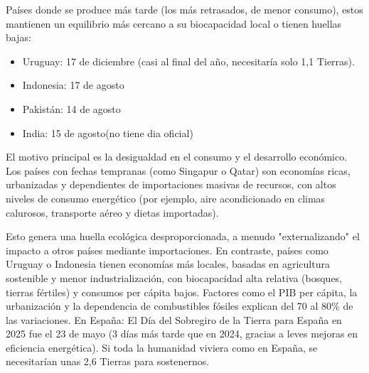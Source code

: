 {\begin{enumerate}[label=\alph*)]
\begin{solution}
Países donde se produce más tarde (los más retrasados, de menor consumo), estos mantienen un equilibrio más cercano
a su biocapacidad local o tienen huellas bajas:
\begin{itemize}
	\item{Uruguay: 17 de diciembre (casi al final del año, necesitaría solo 1,1 Tierras).}
	\item{Indonesia: 17 de agosto}
	\item{Pakistán: 14 de agosto}
	\item{India: 15 de agosto(no tiene dia oficial)}
\end{itemize}

	
\end{solution}

\newpage
\begin{solution}
El motivo principal es la desigualdad en el consumo y el desarrollo económico. Los países con fechas tempranas (como Singapur o Qatar)
son economías ricas, urbanizadas y dependientes de importaciones masivas de recursos, con altos niveles de consumo energético 
(por ejemplo, aire acondicionado en climas calurosos, transporte aéreo y dietas importadas). 
\vspace{1em}

Esto genera una huella ecológica 
desproporcionada, a menudo "externalizando" el impacto a otros países mediante importaciones. En contraste, países como Uruguay 
o Indonesia tienen economías más locales, basadas en agricultura sostenible y menor industrialización, con biocapacidad alta relativa 
(bosques, tierras fértiles) y consumos per cápita bajos. Factores como el PIB per cápita, la urbanización y la dependencia de combustibles fósiles 
explican del 70 al 80\% de las variaciones.
\vspace{1em}
En España:
El Día del Sobregiro de la Tierra para España en 2025 fue el 23 de mayo (3 días más tarde que en 2024, gracias a leves mejoras 
en eficiencia energética). Si toda la humanidad viviera como en España, se necesitarían unas 2,6 Tierras para sostenernos.
\end{solution}
	\end{enumerate}}



